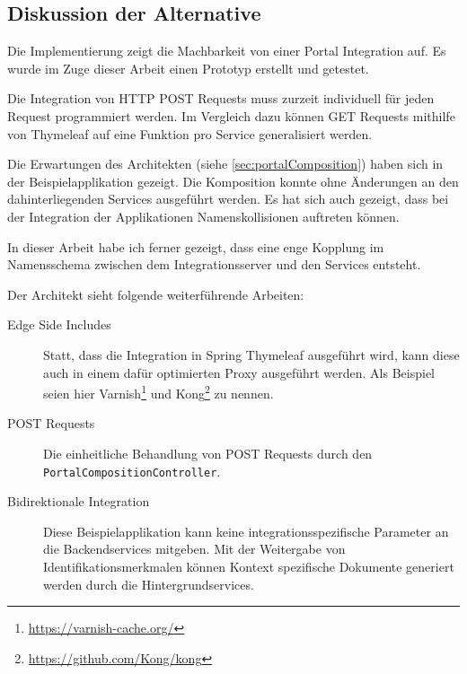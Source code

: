 \subsection{Diskussion der Alternative}

Die Implementierung zeigt die Machbarkeit von einer Portal Integration auf. Es wurde im Zuge dieser Arbeit einen Prototyp erstellt und getestet. 

Die Integration von HTTP POST Requests muss zurzeit individuell für jeden Request programmiert werden. Im Vergleich dazu können GET Requests mithilfe von Thymeleaf auf eine Funktion pro Service generalisiert werden.

Die  Erwartungen des Architekten (siehe \ref{sec:portalComposition}) haben sich in der Beispielapplikation gezeigt. Die Komposition konnte ohne Änderungen an den dahinterliegenden Services ausgeführt werden. Es hat sich auch gezeigt, dass bei der Integration der Applikationen Namenskollisionen auftreten können. 

In dieser Arbeit habe ich ferner gezeigt, dass eine enge Kopplung im Namensschema zwischen dem Integrationsserver und den Services entsteht. 

Der  Architekt sieht folgende weiterführende Arbeiten:
\begin{description}
    \item[Edge Side Includes] Statt, dass die Integration in Spring Thymeleaf ausgeführt wird, kann diese auch in einem dafür optimierten Proxy ausgeführt werden. Als Beispiel seien hier Varnish\footnote{\url{https://varnish-cache.org/}} und Kong\footnote{\url{https://github.com/Kong/kong}} zu nennen.
    \item[POST Requests] Die einheitliche Behandlung von POST Requests durch den \texttt{PortalCompositionController}.
    \item[Bidirektionale Integration] Diese Beispielapplikation kann keine integrationsspezifische Parameter an die Backendservices mitgeben. Mit der Weitergabe von Identifikationsmerkmalen können Kontext spezifische Dokumente generiert werden durch die Hintergrundservices. 
\end{description}